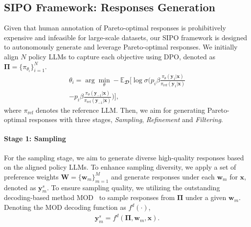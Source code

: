 \subsection{SIPO Framework: Responses Generation}
\label{subsection:self-pareto dpo framework}
Given that human annotation of Pareto-optimal responses is prohibitively expensive and infeasible for large-scale datasets, our SIPO framework is designed to autonomously generate and leverage Pareto-optimal responses. 
We initially align $N$ policy LLMs to capture each objective using DPO, denoted as $\boldsymbol {\Pi} = \{\pi_{\theta_i}\}_{i=1}^N$. 
\begin{multline}
    \theta_i = \arg \min_{\theta} -\mathbb{E}_{\mathbfcal{D}}
    \Bigg[   
    \log \sigma \Bigg( p_i\beta \frac{\pi_\theta(\textbf{y}_1|\textbf{x})}{\pi_{\text{ref}}(\textbf{y}_1|\textbf{x})} \\ - p_i\beta \frac{\pi_\theta(\textbf{y}_{-1}|\textbf{x})}{\pi_{\text{ref}}(\textbf{y}_{-1}|\textbf{x})} \Bigg) \Bigg],
\label{eq:theta_i}
\end{multline}
where $\pi_{\text{ref}}$ denotes the reference LLM.
Then, we aim for generating Pareto-optimal responses with three stages, \emph{Sampling}, \emph{Refinement} and \emph{Filtering}. 


\paragraph{Stage 1: Sampling}
For the sampling stage, we aim to generate diverse high-quality responses based on the aligned policy LLMs. 
To enhance sampling diversity, we apply a set of preference weights $\textbf{W} = \{\textbf{w}_m\}_{m=1}^M$ and generate responses under each $\textbf{w}_m$ for $\textbf{x}$, denoted as $\textbf{y}_m^s$. 
To ensure sampling quality, we utilizing the outstanding decoding-based method MOD~\cite{DBLP:conf/nips/ShiCHLHSD24} to sample responses from $\boldsymbol \Pi$ under a given $\textbf{w}_m$. Denoting the MOD decoding function as $f^d(\cdot)$, 
\begin{align}
    \textbf{y}^s_m = f^d(\boldsymbol \Pi, \textbf{w}_m, \textbf{x}).
\end{align}

